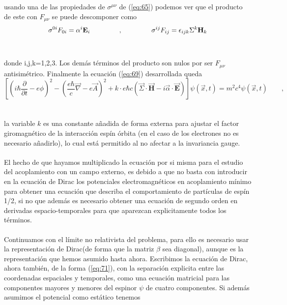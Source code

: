 \documentclass[11pt,letterpaper]{article}     %
\begin{document}
usando una de las propiedades de $\sigma^{\mu \nu}$ de (\ref{eq:65}) podemos ver que el producto de este con $F_{\mu \nu}$ se puede descomponer como
\begin{equation} \label{eq:70}
\sigma^{0 i} F_{0 i}= \alpha^i \textbf{E}_i \hspace{1.5cm}, \hspace{1.5cm} \sigma^{i j} F_{i j}=\epsilon_{ijk} \Sigma^k \textbf{H}_k
\end{equation} \\ \\
donde i,j,k=1,2,3. Los demás términos del producto son nulos por ser $F_{\mu \nu}$ antisimétrico. Finalmente la ecuación (\ref{eq:69}) desarrollada queda
\begin{equation} \label{eq:71}
\left[ \left(i \hbar \frac{\partial}{\partial t} - e \phi\right)^2 - \left( \frac{e \hbar}{c} \vec{\nabla} - e \vec{A}\right)^2 +  \textit{k} \cdot e \hbar c(\vec{\Sigma}\cdot \vec{\textbf{H}} - i \vec{\alpha} \cdot \vec{\textbf{E}})\right]\psi(\vec{x},t)=m^2c^4 \psi(\vec{x},t) \qquad ,
\end{equation} \\ \\
la variable $\textit{k}$ es una constante añadida de forma externa para ajustar el factor giromagnético de la interacción espín órbita (en el caso de los electrones no es necesario añadirlo), lo cual está permitido al no afectar a la invariancia gauge. \\ \\
El hecho de que hayamos multiplicado la ecuación por si misma para el estudio del acoplamiento con un campo externo, es debido a que no basta con introducir en la ecuación de Dirac los potenciales electromagnéticos en acoplamiento mínimo  para obtener una ecuación que describa el comportamiento de partículas de espín 1/2, si no que además es necesario obtener una ecuación de segundo orden en derivadas espacio-temporales para que aparezcan explicitamente todos los términos. \\ \\
Continuamos con el límite no relativista del problema, para ello es necesario usar la representación de Dirac(de forma que la matriz $\beta$ sea diagonal), aunque es la representación que hemos asumido hasta ahora. Escribimos la ecuación de Dirac, ahora también, de la forma (\ref{eq:71}), con la separación explicita entre las coordenadas espaciales y temporales, como una ecuación matricial para las componentes mayores y menores del espinor $\psi$ de cuatro componentes. Si además asumimos el potencial como estático tenemos
\end{document}
